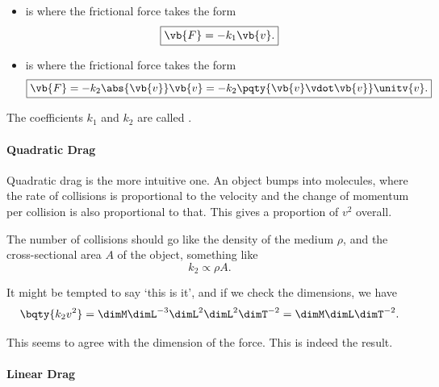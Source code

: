 \begin{definition}
    \label{def:linear-and-quadratic-drag}%
    \begin{itemize}
        \item {} is where the frictional force takes the form
        \begin{equation}
            \boxed{\vb{F} = - k_1 \vb{v}.}
        \end{equation}
        \item {} is where the frictional force takes the form
        \begin{equation}
            \boxed{\vb{F} = - k_2 \abs{\vb{v}} \vb{v} = - k_2 \pqty{\vb{v} \vdot \vb{v}} \unitv{v}.}
        \end{equation}
    \end{itemize}

    The coefficients \(k_1\) and \(k_2\) are called .

\end{definition}

\paragraph{Quadratic Drag}

Quadratic drag is the more intuitive one. An object bumps into molecules, where the rate of collisions is proportional to the velocity and the change of momentum per collision is also proportional to that. This gives a proportion of \(v^2\) overall.

The number of collisions should go like the density of the medium \(\rho\), and the cross-sectional area \(A\) of the object, something like
\begin{equation}
    \boxed{k_2 \propto \rho A.}
\end{equation}

It might be tempted to say `this is it', and if we check the dimensions, we have
\begin{equation}
    \bqty{k_2 v^2} = \dimM \dimL^{-3} \dimL^2 \dimL^2 \dimT^{-2} = \dimM \dimL \dimT^{-2}.
\end{equation}

This seems to agree with the dimension of the force. This is indeed the result.

\paragraph{Linear Drag}

